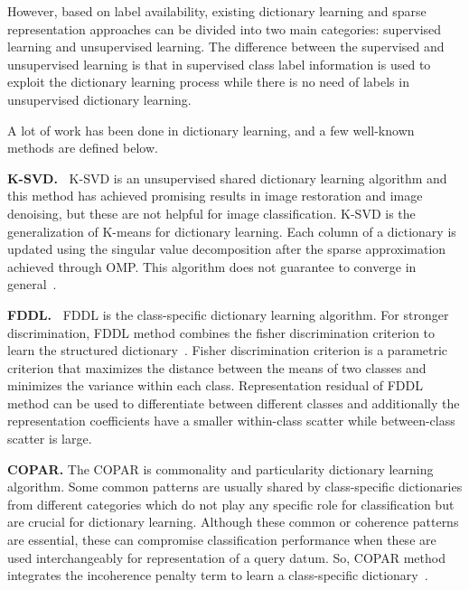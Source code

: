 However, based on label availability, existing dictionary learning and sparse representation approaches can be divided into two main categories: supervised learning and unsupervised learning.
The difference between the supervised and unsupervised learning is that in supervised class label information is used to exploit the dictionary learning process while there is no need of labels in unsupervised dictionary learning. 

A lot of work has been done in dictionary learning, and a few well-known methods are defined below.%


\noindent
\textbf{K-SVD.~}
K-SVD is an unsupervised shared dictionary learning algorithm and this method has achieved promising results in image restoration and image denoising, but these are not helpful for image classification. K-SVD is the generalization of K-means for dictionary learning. Each column of a dictionary is updated using the singular value decomposition after the sparse approximation achieved through OMP. This algorithm does not guarantee to converge in general~\cite{1710377}.%

\noindent
\textbf{FDDL.~}
FDDL is the class-specific dictionary learning algorithm. For stronger discrimination, FDDL method combines the fisher discrimination criterion to learn the structured dictionary~\cite{612628612, xu2017survey}. Fisher discrimination criterion is a parametric criterion that maximizes the distance between the means of two classes and minimizes the variance within each class. Representation residual of FDDL method can be used to differentiate between different classes and additionally the representation coefficients have a smaller within-class scatter while between-class scatter is large.%

\noindent
\textbf{COPAR. }
The COPAR is commonality and particularity dictionary learning algorithm. Some common patterns are usually shared by class-specific dictionaries from different categories which do not play any specific role for classification but are crucial for dictionary learning. Although these common or coherence patterns are essential, these can compromise classification performance when these are used interchangeably for representation of a query datum. So, COPAR method integrates the incoherence penalty term to learn a class-specific dictionary~\cite{kong2012dictionary}. %

